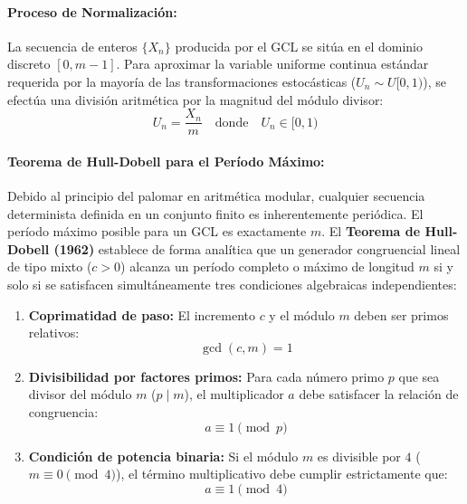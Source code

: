 \documentclass{article}
\begin{document}
\paragraph{Proceso de Normalización:}
La secuencia de enteros $\{X_n\}$ producida por el GCL se sitúa en el dominio discreto $[0, m - 1]$. Para aproximar la variable uniforme continua estándar requerida por la mayoría de las transformaciones estocásticas ($U_n \sim U[0, 1)$), se efectúa una división aritmética por la magnitud del módulo divisor:
\begin{equation}
    U_n = \frac{X_n}{m} \quad \text{donde} \quad U_n \in [0, 1)
\end{equation}

\paragraph{Teorema de Hull-Dobell para el Período Máximo:}
Debido al principio del palomar en aritmética modular, cualquier secuencia determinista definida en un conjunto finito es inherentemente periódica. El período máximo posible para un GCL es exactamente $m$. El \textbf{Teorema de Hull-Dobell (1962)} establece de forma analítica que un generador congruencial lineal de tipo mixto ($c > 0$) alcanza un período completo o máximo de longitud $m$ si y solo si se satisfacen simultáneamente tres condiciones algebraicas independientes:
\begin{enumerate}
    \item \textbf{Coprimatidad de paso:} El incremento $c$ y el módulo $m$ deben ser primos relativos:
    \begin{equation}
        \gcd(c, m) = 1
    \end{equation}
    \item \textbf{Divisibilidad por factores primos:} Para cada número primo $p$ que sea divisor del módulo $m$ ($p \mid m$), el multiplicador $a$ debe satisfacer la relación de congruencia:
    \begin{equation}
        a \equiv 1 \pmod{p}
    \end{equation}
    \item \textbf{Condición de potencia binaria:} Si el módulo $m$ es divisible por $4$ ($m \equiv 0 \pmod{4}$), el término multiplicativo debe cumplir estrictamente que:
    \begin{equation}
        a \equiv 1 \pmod{4}
    \end{equation}
\end{enumerate}
\end{document}
